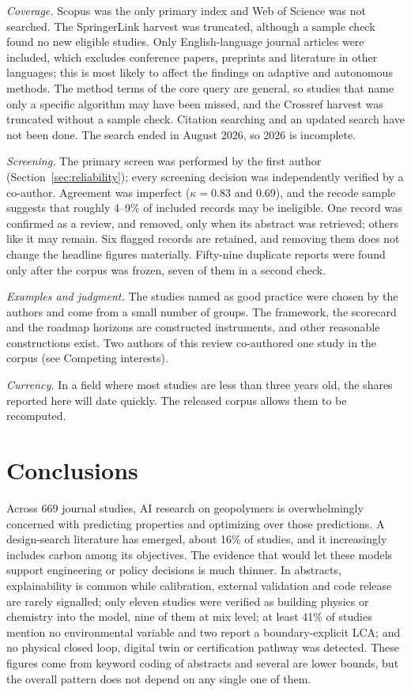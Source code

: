 \documentclass[pdflatex,sn-basic]{sn-jnl}
\begin{document}
\emph{Coverage.} Scopus was the only primary index and Web of Science was not searched. The SpringerLink harvest was truncated, although a sample check found no new eligible studies. Only English-language journal articles were included, which excludes conference papers, preprints and literature in other languages; this is most likely to affect the findings on adaptive and autonomous methods. The method terms of the core query are general, so studies that name only a specific algorithm may have been missed, and the Crossref harvest was truncated without a sample check. Citation searching and an updated search have not been done. The search ended in August 2026, so 2026 is incomplete.

\emph{Screening.} The primary screen was performed by the first author (Section~\ref{sec:reliability}); every screening decision was independently verified by a co-author. Agreement was imperfect ($\kappa = 0.83$ and 0.69), and the recode sample suggests that roughly 4--9\% of included records may be ineligible. One record was confirmed as a review, and removed, only when its abstract was retrieved; others like it may remain. Six flagged records are retained, and removing them does not change the headline figures materially. Fifty-nine duplicate reports were found only after the corpus was frozen, seven of them in a second check.

\emph{Examples and judgment.} The studies named as good practice were chosen by the authors and come from a small number of groups. The framework, the scorecard and the roadmap horizons are constructed instruments, and other reasonable constructions exist. Two authors of this review co-authored one study in the corpus (see Competing interests).

\emph{Currency.} In a field where most studies are less than three years old, the shares reported here will date quickly. The released corpus allows them to be recomputed.

\section{Conclusions}\label{sec:concl}

Across 669 journal studies, AI research on geopolymers is overwhelmingly concerned with predicting properties and optimizing over those predictions. A design-search literature has emerged, about 16\% of studies, and it increasingly includes carbon among its objectives. The evidence that would let these models support engineering or policy decisions is much thinner. In abstracts, explainability is common while calibration, external validation and code release are rarely signalled; only eleven studies were verified as building physics or chemistry into the model, nine of them at mix level; at least 41\% of studies mention no environmental variable and two report a boundary-explicit LCA; and no physical closed loop, digital twin or certification pathway was detected. These figures come from keyword coding of abstracts and several are lower bounds, but the overall pattern does not depend on any single one of them.
\end{document}
